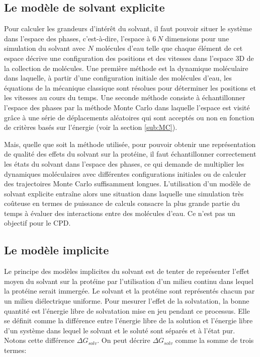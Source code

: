 \subsection{Le modèle de solvant explicite}

Pour calculer les grandeurs d'intérêt du solvant, il faut pouvoir situer le système dans l'espace des phases, c'est-à-dire, l'espace à $6\,N$ dimensions pour une simulation du solvant avec $N$ molécules d'eau telle que chaque élément de cet espace décrive une configuration des positions et des vitesses dans l'espace 3D de la collection de molécules.
Une première méthode est la dynamique moléculaire dans laquelle, à partir d'une configuration initiale des molécules d'eau, les équations de la mécanique classique sont résolues pour déterminer les positions et les vitesses au cours du temps. Une seconde méthode consiste à échantillonner l'espace des phases par la méthode Monte Carlo dans laquelle l'espace est visité grâce à une série de déplacements aléatoires qui sont acceptés ou non en fonction de critères basés sur l'énergie (voir la section \vref{sub:MC}).

Mais, quelle que soit la méthode utilisée, pour pouvoir obtenir une représentation de qualité des effets du solvant sur la protéine, il faut échantillonner correctement les états du solvant dans l'espace des phases, ce qui demande de multiplier les dynamiques moléculaires avec différentes configurations initiales ou de calculer des trajectoires Monte Carlo suffisamment longues.
L'utilisation d'un modèle de solvant explicite entraîne alors une situation dans laquelle une simulation très coûteuse en termes de puissance de calculs consacre la plus grande partie du temps à évaluer des interactions entre des molécules d'eau. Ce n'est pas un objectif pour le CPD.

\subsection{Le modèle implicite}

Le principe des modèles implicites du solvant est de tenter de représenter l'effet moyen du solvant sur la protéine par l'utilisation d'un milieu continu dans lequel la protéine serait immergée. Le solvant et la protéine sont représentés chacun par un milieu diélectrique uniforme.
Pour mesurer l'effet de la solvatation, la bonne quantité est l'énergie libre de solvatation mise en jeu pendant ce processus. Elle se définit comme la différence entre l'énergie libre de la solution et l'énergie libre d'un système dans lequel le solvant et le soluté sont séparés et à l'état pur. Notons cette différence $\Delta G_{solv}$. On peut décrire $\Delta G_{solv}$ comme la somme de trois termes:

